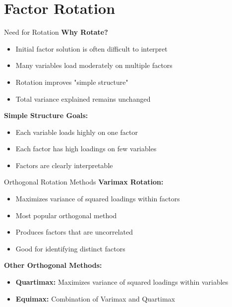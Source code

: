 \documentclass[aspectratio=169]{beamer}
\begin{document}

\section{Factor Rotation}
\begin{frame}
  \sectionpage
\end{frame}

\begin{frame}{Need for Rotation}
  \textbf{Why Rotate?}
  \begin{itemize}
    \item Initial factor solution is often difficult to interpret
    \item Many variables load moderately on multiple factors
    \item Rotation improves "simple structure"
    \item Total variance explained remains unchanged
  \end{itemize}
  
  \textbf{Simple Structure Goals:}
  \begin{itemize}
    \item Each variable loads highly on one factor
    \item Each factor has high loadings on few variables
    \item Factors are clearly interpretable
  \end{itemize}
\end{frame}

\begin{frame}{Orthogonal Rotation Methods}
  \textbf{Varimax Rotation:}
  \begin{itemize}
    \item Maximizes variance of squared loadings within factors
    \item Most popular orthogonal method
    \item Produces factors that are uncorrelated
    \item Good for identifying distinct factors
  \end{itemize}
  
  \textbf{Other Orthogonal Methods:}
  \begin{itemize}
    \item \textbf{Quartimax:} Maximizes variance of squared loadings within variables
    \item \textbf{Equimax:} Combination of Varimax and Quartimax
  \end{itemize}
\end{frame}
\end{document}
